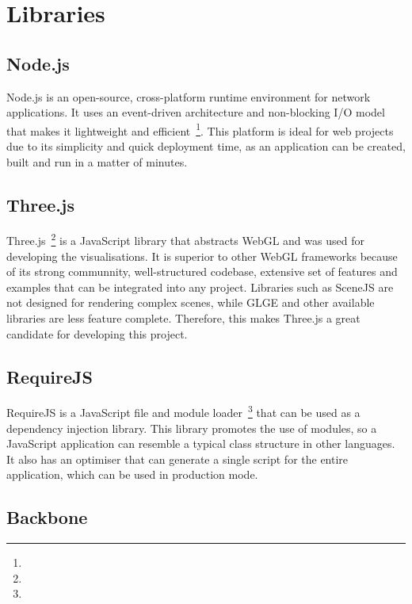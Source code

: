 \section{Libraries} {
\label{sec:libraries}
	
	\subsection{Node.js} {
	\label{sec:nodejs}
	
		Node.js is an open-source, cross-platform runtime environment for network applications. It uses an event-driven architecture and non-blocking I/O model that makes it lightweight and efficient~\footnote{}. This platform is ideal for web projects due to its simplicity and quick deployment time, as an application can be created, built and run in a matter of minutes.

	}

	\subsection{Three.js} {
	\label{sec:threejs}

		Three.js~\footnote{} is a JavaScript library that abstracts WebGL and was used for developing the visualisations. It is superior to other WebGL frameworks because of its strong communnity, well-structured codebase, extensive set of features and examples that can be integrated into any project. Libraries such as SceneJS are not designed for rendering complex scenes, while GLGE and other available libraries are less feature complete. Therefore, this makes Three.js a great candidate for developing this project.

	}

	\subsection{RequireJS} {
	\label{sec:requirejs}
		
		RequireJS is a JavaScript file and module loader~\footnote{} that can be used as a dependency injection library. This library promotes the use of modules, so a JavaScript application can resemble a typical class structure in other languages. It also has an optimiser that can generate a single script for the entire application, which can be used in production mode.

	}

	\subsection{Backbone} {
	\label{sec:backbone}

}}
